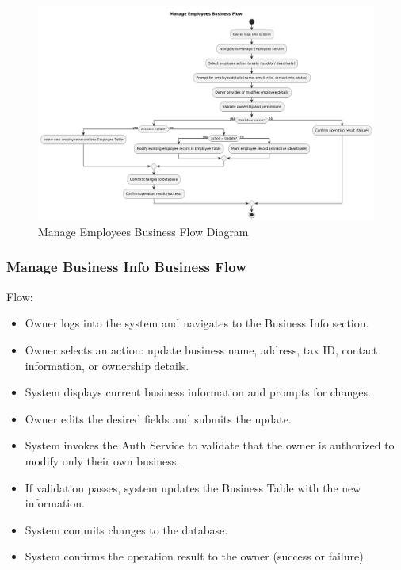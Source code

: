 \documentclass[]{VUMIFTemplateClass}
\begin{document}
\begin{figure}[H]
    \centering
    \includegraphics[width=1\textwidth]{images/diagrams/business/bpmn_employee_manage.png}
    \caption{Manage Employees Business Flow Diagram}
    \label{fig:employee_manage_flow}
\end{figure}

\subsubsection{Manage Business Info Business Flow}

Flow:
\begin{itemize}
    \setlength{\itemsep}{2pt}
    \setlength{\parskip}{0pt}
    \setlength{\parsep}{0pt}
    \item Owner logs into the system and navigates to the Business Info section.
    \item Owner selects an action: update business name, address, tax ID, contact information, or ownership details.
    \item System displays current business information and prompts for changes.
    \item Owner edits the desired fields and submits the update.
    \item System invokes the Auth Service to validate that the owner is authorized to modify only their own business.
    \item If validation passes, system updates the Business Table with the new information.
    \item System commits changes to the database.
    \item System confirms the operation result to the owner (success or failure).
\end{itemize}
\end{document}
